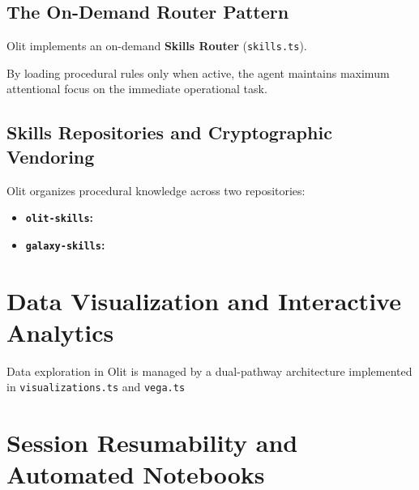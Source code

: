 \subsection{The On-Demand Router Pattern}
Olit implements an on-demand \textbf{Skills Router} (\texttt{skills.ts}). 

By loading procedural rules only when active, the agent maintains maximum attentional focus on the immediate operational task.

\subsection{Skills Repositories and Cryptographic Vendoring}
Olit organizes procedural knowledge across two repositories:
\begin{itemize}
    \item \textbf{\texttt{olit-skills}:} 
    \item \textbf{\texttt{galaxy-skills}:} 
\end{itemize}


\section{Data Visualization and Interactive Analytics}
\label{sec:visual_analytics}

Data exploration in Olit is managed by a dual-pathway architecture implemented in \texttt{visualizations.ts} and \texttt{vega.ts}


\section{Session Resumability and Automated Notebooks}
\label{sec:resumability_notebooks}

